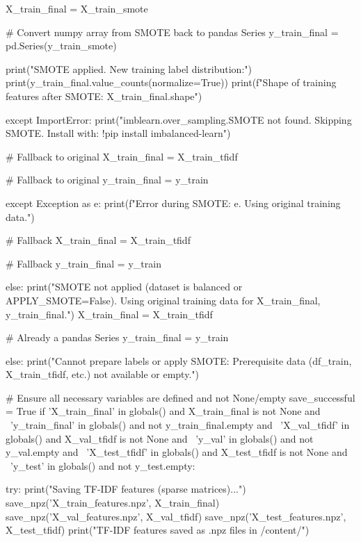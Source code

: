 \begin{ffcode}
            X_train_final = X_train_smote

            # Convert numpy array from SMOTE back to pandas Series
            y_train_final = pd.Series(y_train_smote)

            print("SMOTE applied. New training label distribution:")
            print(y_train_final.value_counts(normalize=True))
            print(f"Shape of training features after SMOTE: {X_train_final.shape}")

        except ImportError:
            print("imblearn.over_sampling.SMOTE not found. Skipping SMOTE. Install with: !pip install imbalanced-learn")

            # Fallback to original
            X_train_final = X_train_tfidf

            # Fallback to original
            y_train_final = y_train

        except Exception as e:
            print(f"Error during SMOTE: {e}. Using original training data.")

            # Fallback
            X_train_final = X_train_tfidf

            # Fallback
            y_train_final = y_train

    else:
        print("SMOTE not applied (dataset is balanced or APPLY_SMOTE=False). Using original training data for X_train_final, y_train_final.")
        X_train_final = X_train_tfidf

        # Already a pandas Series
        y_train_final = y_train

else:
    print("Cannot prepare labels or apply SMOTE: Prerequisite data (df_train, X_train_tfidf, etc.) not available or empty.")

# Ensure all necessary variables are defined and not None/empty
save_successful = True
if 'X_train_final' in globals() and X_train_final is not None and \
    'y_train_final' in globals() and not y_train_final.empty and \
    'X_val_tfidf' in globals() and X_val_tfidf is not None and \
    'y_val' in globals() and not y_val.empty and \
    'X_test_tfidf' in globals() and X_test_tfidf is not None and \
    'y_test' in globals() and not y_test.empty:

    try:
        print("Saving TF-IDF features (sparse matrices)...")
        save_npz('X_train_features.npz', X_train_final)
        save_npz('X_val_features.npz', X_val_tfidf)
        save_npz('X_test_features.npz', X_test_tfidf)
        print("TF-IDF features saved as .npz files in /content/")


\end{ffcode}
